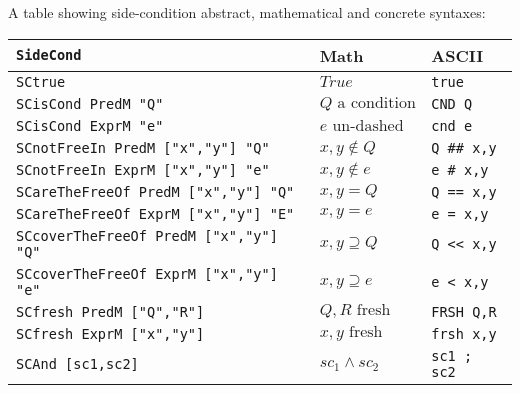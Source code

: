 A table showing side-condition abstract,
mathematical and concrete syntaxes:

\begin{tabular}{|l|l|l|}
  \hline
  \texttt{SideCond} & Math & ASCII
  \\\hline
  \texttt{SCtrue} & $True$ & \texttt{true}
  \\\hline
  \texttt{SCisCond PredM "Q"} & $Q \mbox{ a condition}$
  & \texttt{CND Q}
  \\\hline
  \texttt{SCisCond ExprM "e"} & $e \mbox{ un-dashed}$
  & \texttt{cnd e}
  \\\hline
  \texttt{SCnotFreeIn PredM ["x","y"] "Q"} & $x,y \notin {Q}$
  & \texttt{Q \#\# x,y}
  \\\hline
  \texttt{SCnotFreeIn ExprM ["x","y"] "e"} & $x,y \notin {e}$
  & \texttt{e \# x,y}
  \\\hline
  \texttt{SCareTheFreeOf PredM ["x","y"] "Q"} & $x,y = {Q}$
  & \texttt{Q == x,y}
  \\\hline
  \texttt{SCareTheFreeOf ExprM ["x","y"] "E"} & $x,y = {e}$
  & \texttt{e = x,y}
  \\\hline
  \texttt{SCcoverTheFreeOf PredM ["x","y"] "Q"} & $x,y \supseteq {Q}$
  & \texttt{Q << x,y}
  \\\hline
  \texttt{SCcoverTheFreeOf ExprM ["x","y"] "e"} & $x,y \supseteq {e}$
  & \texttt{e < x,y}
  \\\hline
  \texttt{SCfresh PredM ["Q","R"]} & $Q, R \mbox{ fresh}$
  & \texttt{FRSH Q,R}
  \\\hline
  \texttt{SCfresh ExprM ["x","y"]} & $x, y \mbox{ fresh}$
  & \texttt{frsh x,y}
  \\\hline
  \texttt{SCAnd [sc1,sc2]} & $sc_1 \land sc_2$
  & \texttt{sc1 ; sc2}
  \\\hline
\end{tabular}
